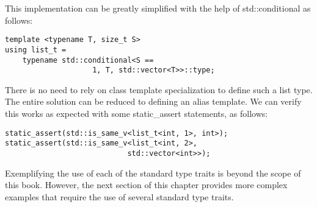 This implementation can be greatly simplified with the help of std::conditional as follows:

\begin{lstlisting}[style=styleCXX]
template <typename T, size_t S>
using list_t =
	typename std::conditional<S ==
					1, T, std::vector<T>>::type;
\end{lstlisting}

There is no need to rely on class template specialization to define such a list type. The entire solution can be reduced to defining an alias template. We can verify this works as expected with some static\_assert statements, as follows:

\begin{lstlisting}[style=styleCXX]
static_assert(std::is_same_v<list_t<int, 1>, int>);
static_assert(std::is_same_v<list_t<int, 2>,
							std::vector<int>>);
\end{lstlisting}

Exemplifying the use of each of the standard type traits is beyond the scope of this book. However, the next section of this chapter provides more complex examples that require the use of several standard type traits.



























